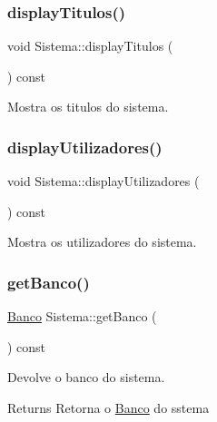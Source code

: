 \subsubsection{\texorpdfstring{display\+Titulos()}{displayTitulos()}}
{\footnotesize\ttfamily void Sistema\+::display\+Titulos (\begin{DoxyParamCaption}{ }\end{DoxyParamCaption}) const}



Mostra os titulos do sistema. 

\mbox{\label{class_sistema_ac22188d7bcfb9df24776d67900b9d7fb}} 
\subsubsection{\texorpdfstring{display\+Utilizadores()}{displayUtilizadores()}}
{\footnotesize\ttfamily void Sistema\+::display\+Utilizadores (\begin{DoxyParamCaption}{ }\end{DoxyParamCaption}) const}



Mostra os utilizadores do sistema. 

\mbox{\label{class_sistema_abb768fdc8d4b8290ab4a267fc7a84a39}} 
\subsubsection{\texorpdfstring{get\+Banco()}{getBanco()}}
{\footnotesize\ttfamily \mbox{\hyperlink{class_banco}{Banco}} Sistema\+::get\+Banco (\begin{DoxyParamCaption}{ }\end{DoxyParamCaption}) const}



Devolve o banco do sistema. 

\begin{DoxyReturn}{Returns}
Retorna o \mbox{\hyperlink{class_banco}{Banco}} do sstema 
\end{DoxyReturn}
\mbox{\label{class_sistema_acb9f4d8c3ee7d1a24f8784c379f660df}} 
